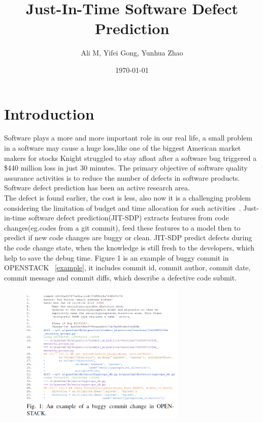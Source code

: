 \documentclass{article}
\title{Just-In-Time Software Defect Prediction}
\author{Ali M, Yifei Gong, Yunhua Zhao}
\date{\today}
\begin{document}
\maketitle

\section{Introduction}
Software plays a more and more important role in our real life, a small problem in a software may cause a huge loss,like one of the biggest American market makers for stocks Knight struggled to stay afloat after a software bug triggered a \$440 million loss in just 30 minutes. The primary objective of software quality assurance activities is to reduce the number of defects in software products. Software defect prediction has been an active research area. \\
The defect is found earlier, the cost is less, also now it is a challenging problem considering the limitation of budget and time allocation for such activities~\cite{wan2018perceptions}. Just-in-time software defect prediction(JIT-SDP) extracts features from code changes(eg.codes from a git commit), feed these features to a model then to predict if new code changes are buggy or clean. JIT-SDP predict defects during the code change state, when the knowledge is still fresh to the developers, which help to save the debug time. Figure 1 is an example of buggy commit in OPENSTACK ~\ref{example}, it includes commit id, commit author, commit date, commit message and commit diffs, which describe a defective code submit. 
\begin{figure}[H]
	\includegraphics[width=8cm]{1}
	\label{fig:example}
	\centering
\end{figure}
\end{document}
